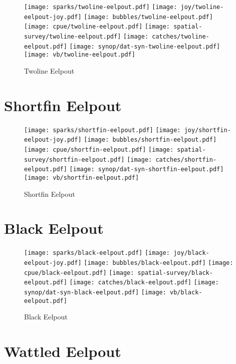 \begin{figure}[htbp]
\centering
\texttt{[image: sparks/twoline-eelpout.pdf]}
\texttt{[image: joy/twoline-eelpout-joy.pdf]}
\texttt{[image: bubbles/twoline-eelpout.pdf]}
\texttt{[image: cpue/twoline-eelpout.pdf]}
\texttt{[image: spatial-survey/twoline-eelpout.pdf]}
\texttt{[image: catches/twoline-eelpout.pdf]}
\texttt{[image: synop/dat-syn-twoline-eelpout.pdf]}
\texttt{[image: vb/twoline-eelpout.pdf]}
\caption{Twoline Eelpout}
\end{figure}
\clearpage
\section{Shortfin Eelpout}

\begin{figure}[htbp]
\centering
\texttt{[image: sparks/shortfin-eelpout.pdf]}
\texttt{[image: joy/shortfin-eelpout-joy.pdf]}
\texttt{[image: bubbles/shortfin-eelpout.pdf]}
\texttt{[image: cpue/shortfin-eelpout.pdf]}
\texttt{[image: spatial-survey/shortfin-eelpout.pdf]}
\texttt{[image: catches/shortfin-eelpout.pdf]}
\texttt{[image: synop/dat-syn-shortfin-eelpout.pdf]}
\texttt{[image: vb/shortfin-eelpout.pdf]}
\caption{Shortfin Eelpout}
\end{figure}
\clearpage
\section{Black Eelpout}

\begin{figure}[htbp]
\centering
\texttt{[image: sparks/black-eelpout.pdf]}
\texttt{[image: joy/black-eelpout-joy.pdf]}
\texttt{[image: bubbles/black-eelpout.pdf]}
\texttt{[image: cpue/black-eelpout.pdf]}
\texttt{[image: spatial-survey/black-eelpout.pdf]}
\texttt{[image: catches/black-eelpout.pdf]}
\texttt{[image: synop/dat-syn-black-eelpout.pdf]}
\texttt{[image: vb/black-eelpout.pdf]}
\caption{Black Eelpout}
\end{figure}
\clearpage
\section{Wattled Eelpout}

